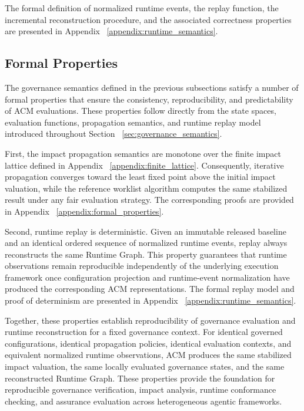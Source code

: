 \documentclass[10pt]{article}
\begin{document}
The formal definition of normalized runtime events, the replay function, the
incremental reconstruction procedure, and the associated correctness properties
are presented in Appendix ~\ref{appendix:runtime_semantics}.

\subsection{Formal Properties}
\label{sec:formal_properties}

The governance semantics defined in the previous subsections satisfy a number of formal properties that ensure the consistency, reproducibility, and predictability of ACM evaluations. These properties follow directly from the state spaces, evaluation functions, propagation semantics, and runtime replay model introduced throughout Section ~\ref{sec:governance_semantics}.

First, the impact propagation semantics are monotone over the finite impact lattice defined in Appendix ~\ref{appendix:finite_lattice}. Consequently, iterative propagation converges toward the least fixed point above the initial impact valuation, while the reference worklist algorithm computes the same stabilized result under any fair evaluation strategy. The corresponding proofs are provided in Appendix ~\ref{appendix:formal_properties}.

Second, runtime replay is deterministic. Given an immutable released baseline and an identical ordered sequence of normalized runtime events, replay always reconstructs the same Runtime Graph. This property guarantees that runtime observations remain reproducible independently of the underlying execution framework once configuration projection and runtime-event normalization have produced the corresponding ACM representations. The formal replay model and proof of determinism are presented in Appendix ~\ref{appendix:runtime_semantics}.

Together, these properties establish reproducibility of governance evaluation and runtime reconstruction for a fixed governance context. For identical governed configurations, identical propagation policies, identical evaluation contexts, and equivalent normalized runtime observations, ACM produces the same
stabilized impact valuation, the same locally evaluated governance states, and the same reconstructed Runtime Graph. These properties provide the foundation for reproducible governance verification, impact analysis, runtime conformance checking, and assurance evaluation across heterogeneous agentic frameworks.
\end{document}
